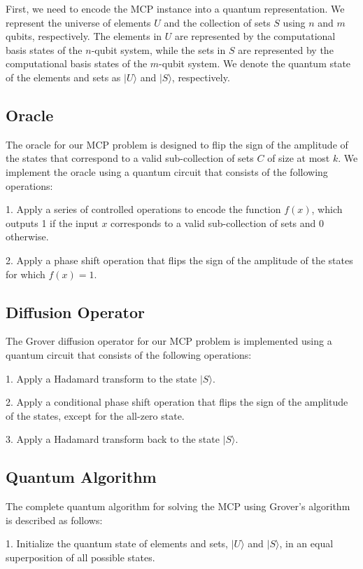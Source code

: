 First, we need to encode the MCP instance into a quantum representation. We represent the universe of elements $U$ and the collection of sets $S$ using $n$ and $m$ qubits, respectively. The elements in $U$ are represented by the computational basis states of the $n$-qubit system, while the sets in $S$ are represented by the computational basis states of the $m$-qubit system. We denote the quantum state of the elements and sets as $|U\rangle$ and $|S\rangle$, respectively.

\subsection{Oracle}

The oracle for our MCP problem is designed to flip the sign of the amplitude of the states that correspond to a valid sub-collection of sets $C$ of size at most $k$. We implement the oracle using a quantum circuit that consists of the following operations:

1. Apply a series of controlled operations to encode the function $f(x)$, which outputs 1 if the input $x$ corresponds to a valid sub-collection of sets and 0 otherwise.

2. Apply a phase shift operation that flips the sign of the amplitude of the states for which $f(x) = 1$.

\subsection{Diffusion Operator}

The Grover diffusion operator for our MCP problem is implemented using a quantum circuit that consists of the following operations:

1. Apply a Hadamard transform to the state $|S\rangle$.

2. Apply a conditional phase shift operation that flips the sign of the amplitude of the states, except for the all-zero state.

3. Apply a Hadamard transform back to the state $|S\rangle$.

\subsection{Quantum Algorithm}

The complete quantum algorithm for solving the MCP using Grover's algorithm is described as follows:

1. Initialize the quantum state of elements and sets, $|U\rangle$ and $|S\rangle$, in an equal superposition of all possible states.

